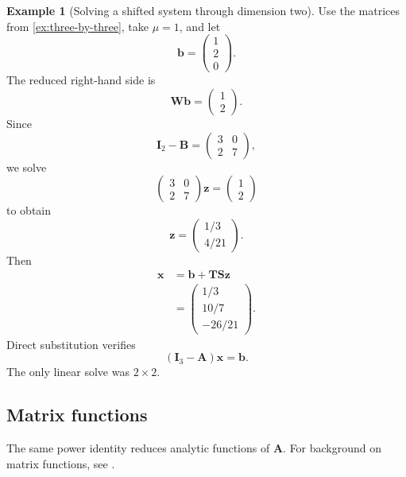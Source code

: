 \documentclass[11pt]{article}
\newcommand{\I}{\mathbf{I}}
\newcommand{\mat}[1]{\mathbf{#1}}
\newcommand{\vect}[1]{\mathbf{#1}}
\theoremstyle{definition}
\newtheorem{example}[example]{Example}
\theoremstyle{remark}
\begin{document}
\begin{example}[Solving a shifted system through dimension two]
\label{ex:shifted-solve}
Use the matrices from \cref{ex:three-by-three}, take \(\mu=1\), and let
\[
  \vect{b}=
  \begin{pmatrix}1\\2\\0\end{pmatrix}.
\]
The reduced right-hand side is
\[
  \mat{W}\vect{b}
  =
  \begin{pmatrix}1\\2\end{pmatrix}.
\]
Since
\[
  \I_2-\mat{B}
  =
  \begin{pmatrix}
    3&0\\
    2&7
  \end{pmatrix},
\]
we solve
\[
  \begin{pmatrix}
    3&0\\
    2&7
  \end{pmatrix}
  \vect{z}
  =
  \begin{pmatrix}1\\2\end{pmatrix}
\]
to obtain
\begin{equation}
  \vect{z}
  =
  \begin{pmatrix}
    1/3\\
    4/21
  \end{pmatrix}.
  \label{eq:example-z}
\end{equation}
Then
\begin{align*}
  \vect{x}
  &=\vect{b}+\mat{T}\mat{S}\vect{z}\\
  &=
  \begin{pmatrix}
    1/3\\
    10/7\\
    -26/21
  \end{pmatrix}.
\end{align*}
Direct substitution verifies
\[
  (\I_3-\mat{A})\vect{x}=\vect{b}.
\]
The only linear solve was \(2\times2\).
\end{example}

\subsection{Matrix functions}

The same power identity reduces analytic functions of \(\mat{A}\). For background on matrix functions, see \textcite{higham2008functions}.
\end{document}
